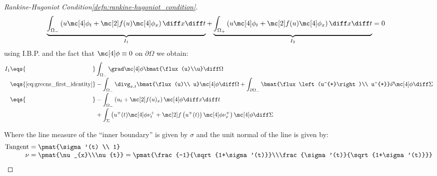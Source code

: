 \begin{proofbox}
\begin{proof}[Rankine-Hugoniot Condition\cref{defn:rankine-hugoniot_condition}]
\begin{align*}
          &\underbrace{\int_{\Omega_{-}}\left(u\testfunc_{t}+\flux(u)\testfunc_{x}\right)\diff x \diff t}_{I_{1}}
            +\underbrace{\int_{\Omega_{+}}\left(u\testfunc_{t}+\flux(u)\testfunc_{x}\right)\diff x \diff t}_{I_{2}}=0
        \end{align*}
        using I.B.P. and the fact that $\testfunc\equiv0$ on $\partial\Omega$ we obtain:
        \begin{align*}
          I_{1}\eqs{\hphantom{\text{\cref{eq:greens_first_identity}}}}&\int_{\Omega_{-}}\grad\testfunc\bmat{\flux(u)\\u}\diff\Omega \\[-1\jot]
               \eqs{\text{\cref{eq:greens_first_identity}}}&
                 -\int_{\Omega_{-}}\divg_{x,t}\bmat{\flux(u)\\ u}\testfunc\diff\Omega
                 +\int_{\partial\Omega_{-}}\bmat{\flux\left(u^{+}\right)\\ u^{+}}\vec{\nu}\testfunc\diff \Sigma
          \\[-1\jot]
               \eqs{\hphantom{\text{\cref{eq:greens_first_identity}}}}&
                 -\int_{\Omega_{-}}\left(u_{t}+\flux(u)_{x}\right)\testfunc\diff x\diff t \\[-1\jot]
               &+\int_{\Sigma}\left(u^{+}(t)\testfunc\nu_{t}^{+}+\flux \left(u^{+}(t)\right)\testfunc\nu_{x}^{+}\right)\testfunc\diff\Sigma
        \end{align*}
        \begin{minipage}[c]{0.3\textwidth}
            \begin{figure}[H]
                \centering{
                  \def\svgwidth{60pt}
                  \resizebox{\linewidth}{!}{}
                }
            \end{figure}
        \end{minipage}\hfill
        \begin{minipage}{0.65\textwidth}
            Where the line measure of the ``inner boundary'' is given by $\sigma$ and the unit normal of the line is given by:
            \begin{align*}
              \text{Tangent}&=\pmat{\sigma'(t) \\ 1}\\[-1\jot]
              \nu&=\pmat{\nu_{x}\\\nu{t}}=\pmat{\frac{-1}{\sqrt{1+\sigma'(t)}}\\\frac{\sigma'(t)}{\sqrt{1+\sigma'(t)}}}
            \end{align*}

\end{minipage}
\end{proof}
\end{proofbox}
